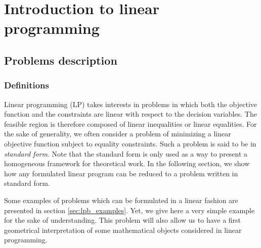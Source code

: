 \chapter{Introduction to linear programming}
\label{chap:lp}

\section{Problems description}

\subsection{Definitions}
Linear programming (LP) takes interests in problems in which both the objective function and the constraints are linear with respect to the decision variables. The feasible region is therefore composed of linear inequalities or linear equalities. For the sake of generality, we often consider a problem of minimizing a linear objective function subject to equality constraints. Such a problem is said to be in \textit{standard form}. Note that the standard form is only used as a way to present a homogeneous framework for theoretical work. In the following section, we show how any formulated linear program can be reduced to a problem written in standard form.

Some examples of problems which can be formulated in a linear fashion are presented in section \ref{sec:lpb_examples}. Yet, we give here a very simple example for the sake of understanding. This problem will also allow us to have a first geometrical interpretation of some mathematical objects considered in linear programming. 

